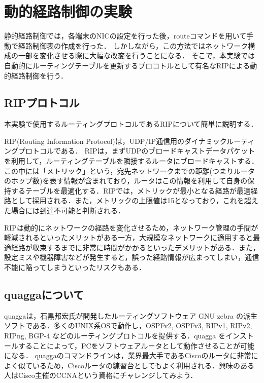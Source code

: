 
%

\section{動的経路制御の実験}
静的経路制御では，各端末のNICの設定を行った後，routeコマンドを用いて手動で経路制御表の作成を行った．
しかしながら，この方法ではネットワーク構成の一部を変化させる際に大幅な改変を行うことになる．
そこで，本実験では自動的にルーティングテーブルを更新するプロコトルとして有名なRIPによる動的経路制御を行う．

\subsection{RIPプロトコル}
本実験で使用するルーティングプロトコルであるRIPについて簡単に説明する．

RIP(Routing Information Protocol)は，UDP/IP通信用のダイナミックルーティングプロトコルである．
RIPは，まずUDPのブロードキャストデータパケットを利用して，ルーティングテーブルを隣接するルータにブロードキャストする．この中には「メトリック」という，宛先ネットワークまでの距離(つまりルータのホップ数)を表す情報が含まれており，ルータはこの情報を利用して自身の保持するテーブルを最適化する．RIPでは，メトリックが最小となる経路が最適経路として採用される．また，メトリックの上限値は15となっており，これを超えた場合には到達不可能と判断される．

RIPは動的にネットワークの経路を変化させるため，ネットワーク管理の手間が軽減されるといったメリットがある一方，大規模なネットワークに適用すると最適経路が収束するまでに非常に時間がかかるといったデメリットがある．また，設定ミスや機器障害などが発生すると，誤った経路情報が広まってしまい，通信不能に陥ってしまうといったリスクもある．

\subsection{quaggaについて}
quaggaは，石黒邦宏氏が開発したルーティングソフトウェア GNU zebra の派生ソフトである．多くのUNIX系OSで動作し，OSPFv2, OSPFv3, RIPv1, RIPv2, RIPng, BGP-4 などのルーティングプロトコルを提供する．quagga をインストールすることによって，PCをソフトウェアルータとして動作させることが可能になる．
quaggaのコマンドラインは，業界最大手であるCiscoのルータに非常によく似ているため，Ciscoルータの練習台としてもよく利用される．興味のある人はCisco主催のCCNAという資格にチャレンジしてみよう．

